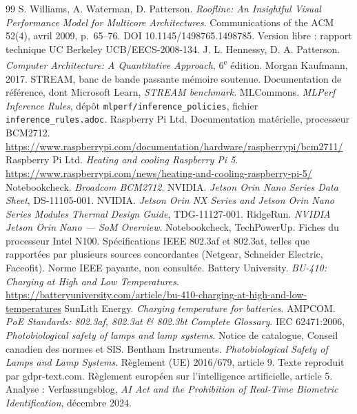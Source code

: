 \documentclass[11pt,a4paper]{article}
\begin{document}
\begin{thebibliography}{99}
\small
{} S. Williams, A. Waterman, D. Patterson. \emph{Roofline: An
  Insightful Visual Performance Model for Multicore Architectures}. Communications of
  the ACM 52(4), avril 2009, p.~65--76. DOI 10.1145/1498765.1498785. Version libre :
  rapport technique UC Berkeley UCB/EECS-2008-134.
 J. L. Hennessy, D. A. Patterson. \emph{Computer Architecture: A
  Quantitative Approach}, 6\textsuperscript{e} édition. Morgan Kaufmann, 2017.
 STREAM, banc de bande passante mémoire soutenue. Documentation de
  référence, dont Microsoft Learn, \emph{STREAM benchmark}.
 MLCommons. \emph{MLPerf Inference Rules}, dépôt
  \texttt{mlperf/inference\_policies}, fichier \texttt{inference\_rules.adoc}.
 Raspberry Pi Ltd. Documentation matérielle, processeur BCM2712.
  \url{https://www.raspberrypi.com/documentation/hardware/raspberrypi/bcm2711/}
 Raspberry Pi Ltd. \emph{Heating and cooling Raspberry Pi 5}.
  \url{https://www.raspberrypi.com/news/heating-and-cooling-raspberry-pi-5/}
 Notebookcheck. \emph{Broadcom BCM2712}.
 NVIDIA. \emph{Jetson Orin Nano Series Data Sheet}, DS-11105-001.
 NVIDIA. \emph{Jetson Orin NX Series and Jetson Orin Nano Series
  Modules Thermal Design Guide}, TDG-11127-001.
 RidgeRun. \emph{NVIDIA Jetson Orin Nano — SoM Overview}.
 Notebookcheck, TechPowerUp. Fiches du processeur Intel N100.
 Spécifications IEEE 802.3af et 802.3at, telles que rapportées par
  plusieurs sources concordantes (Netgear, Schneider Electric, Faceofit). Norme IEEE
  payante, non consultée.
 Battery University. \emph{BU-410: Charging at High and Low
  Temperatures}.
  \url{https://batteryuniversity.com/article/bu-410-charging-at-high-and-low-temperatures}
 SunLith Energy. \emph{Charging temperature for batteries}.
 AMPCOM. \emph{PoE Standards: 802.3af, 802.3at \& 802.3bt Complete
  Glossary}.
 {\NoAutoSpacing IEC 62471:2006}, \emph{Photobiological safety of lamps and lamp
  systems}. Notice de catalogue, Conseil canadien des normes et SIS.
 Bentham Instruments. \emph{Photobiological Safety of Lamps and Lamp
  Systems}.
 Règlement (UE) 2016/679, article 9. Texte reproduit par gdpr-text.com.
 Règlement européen sur l'intelligence artificielle, article 5. Analyse :
  Verfassungsblog, \emph{AI Act and the Prohibition of Real-Time Biometric
  Identification}, décembre 2024.
\end{thebibliography}
\end{document}
